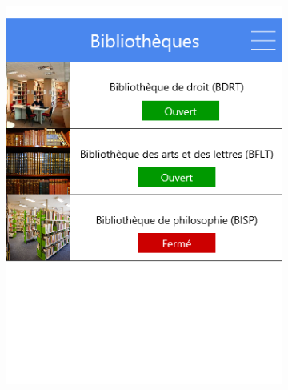 \documentclass{eplmastersthesis}
\begin{document}
\begin{figure}[H]
    \centering
\begin{subfigure}[b]{0.3\textwidth}
        \includegraphics[width=\textwidth]{Images/InVision/menu-bibli.png}
    \end{subfigure}
    ~ %
    \begin{subfigure}[b]{0.3\textwidth}

\end{subfigure}
\end{figure}
\end{document}
